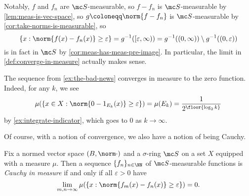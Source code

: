 \documentclass[../notes.tex]{subfiles}
\begin{document}
\begin{remark}
	Notably, $f$ and $f_n$ are $\mc S$-measurable, so $f-f_n$ is $\mc S$-measurable by \autoref{lem:meas-is-vec-space}, so $g\coloneqq\norm{f-f_n}$ is $\mc S$-measurable by \autoref{cor:take-norms-is-measurable}, so
	\[\{x:\norm{f(x)-f_n(x)}\ge\varepsilon\}=g^{-1}([\varepsilon,\infty))=g^{-1}((0,\infty))\setminus g^{-1}((0,\varepsilon))\]
	is in fact in $\mc S$ by \autoref{cor:meas-has-meas-pre-image}. In particular, the limit in \autoref{def:converge-in-measure} actually makes sense.
\end{remark}
\begin{example}
	The sequence from \autoref{ex:the-bad-news} converges in measure to the zero function. Indeed, for any $k$, we see
	\[\mu(\{x\in X:\norm{0-1_{E_k}(x)}\ge\varepsilon\})=\mu(E_k)=\frac1{2^{\floor{\log_2k}}}\]
	by \autoref{ex:integrate-indicator}, which goes to $0$ as $k\to\infty$.
\end{example}
Of course, with a notion of convergence, we also have a notion of being Cauchy.
\begin{definition}
	Fix a normed vector space $(B,\norm\cdot)$ and a $\sigma$-ring $\mc S$ on a set $X$ equipped with a measure $\mu$. Then a sequence $\{f_n\}_{n\in\NN}$ of $\mc S$-measurable functions is \textit{Cauchy in measure} if and only if all $\varepsilon>0$ have
	\[\lim_{m,n\to\infty}\mu(\{x:\norm{f_m(x)-f_n(x)}\ge\varepsilon\})=0.\]
\end{definition}
\end{document}
